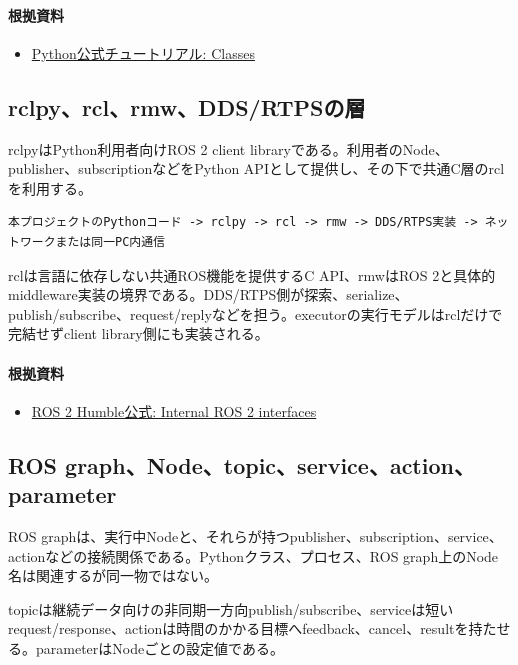 \documentclass[a4paper,11pt]{article}
\begin{document}
\paragraph{根拠資料}
\begin{itemize}[leftmargin=1.6em]
\item \href{https://docs.python.org/3/tutorial/classes.html}{Python公式チュートリアル: Classes}
\end{itemize}

\subsection{rclpy、rcl、rmw、DDS/RTPSの層}
rclpyはPython利用者向けROS 2 client libraryである。利用者のNode、publisher、subscriptionなどをPython APIとして提供し、その下で共通C層のrclを利用する。


\begin{lstlisting}
本プロジェクトのPythonコード -> rclpy -> rcl -> rmw -> DDS/RTPS実装 -> ネットワークまたは同一PC内通信
\end{lstlisting}


rclは言語に依存しない共通ROS機能を提供するC API、rmwはROS 2と具体的middleware実装の境界である。DDS/RTPS側が探索、serialize、publish/subscribe、request/replyなどを担う。executorの実行モデルはrclだけで完結せずclient library側にも実装される。

\paragraph{根拠資料}
\begin{itemize}[leftmargin=1.6em]
\item \href{https://docs.ros.org/en/humble/Concepts/About-Internal-Interfaces.html}{ROS 2 Humble公式: Internal ROS 2 interfaces}
\end{itemize}

\subsection{ROS graph、Node、topic、service、action、parameter}
ROS graphは、実行中Nodeと、それらが持つpublisher、subscription、service、actionなどの接続関係である。Pythonクラス、プロセス、ROS graph上のNode名は関連するが同一物ではない。


topicは継続データ向けの非同期一方向publish/subscribe、serviceは短いrequest/response、actionは時間のかかる目標へfeedback、cancel、resultを持たせる。parameterはNodeごとの設定値である。
\end{document}
